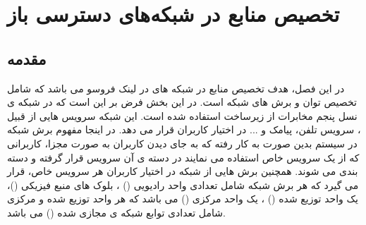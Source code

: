 \chapter{تخصیص منابع در شبکه‌های دسترسی باز}
\section{مقدمه}
در این فصل، هدف تخصیص منابع در شبکه های  در لینک فروسو می باشد که شامل تخصیص توان و برش های شبکه است.
در این بخش فرض بر این است که در شبکه ی نسل پنجم مخابرات از زیرساخت  استفاده شده است. این شبکه سرویس هایی از قبیل ، سرویس تلفن، پیامک و ... در اختیار کاربران قرار می دهد. در اینجا  مفهوم برش شبکه در سیستم بدین صورت به کار رفته که به جای دیدن کاربران به صورت مجزا، کاربرانی که از یک سرویس خاص استفاده می نمایند در دسته ی آن سرویس قرار گرفته و دسته بندی می شوند. همچنین برش هایی از شبکه در اختیار کاربران هر سرویس خاص، قرار می گیرد که هر برش شبکه شامل تعدادی واحد رادیویی
() 
،
بلوک های منبع فیزیکی
 ()، 
 یک واحد توزیع شده
() 
 ، 
 یک واحد مرکزی
()  
  می باشد که هر واحد توزیع شده و مرکزی شامل تعدادی توابع شبکه ی مجازی شده
() 
می باشد. 

